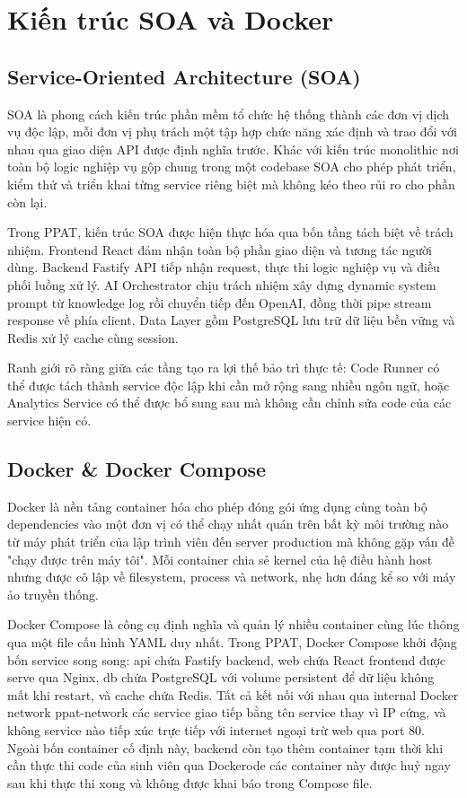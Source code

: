 \documentclass[../main.tex]{subfiles}
\begin{document}
\section{Kiến trúc SOA và Docker}

\subsection{Service-Oriented Architecture (SOA)}

SOA là phong cách kiến trúc phần mềm tổ chức hệ thống thành các đơn vị dịch vụ độc lập, mỗi đơn vị phụ trách một tập hợp chức năng xác định và trao đổi với nhau qua giao diện API được định nghĩa trước. Khác với kiến trúc monolithic nơi toàn bộ logic nghiệp vụ gộp chung trong một codebase SOA cho phép phát triển, kiểm thử và triển khai từng service riêng biệt mà không kéo theo rủi ro cho phần còn lại.

Trong PPAT, kiến trúc SOA được hiện thực hóa qua bốn tầng tách biệt về trách nhiệm. Frontend React đảm nhận toàn bộ phần giao diện và tương tác người dùng. Backend Fastify API tiếp nhận request, thực thi logic nghiệp vụ và điều phối luồng xử lý. AI Orchestrator chịu trách nhiệm xây dựng dynamic system prompt từ knowledge log rồi chuyển tiếp đến OpenAI, đồng thời pipe stream response về phía client. Data Layer gồm PostgreSQL lưu trữ dữ liệu bền vững và Redis xử lý cache cùng session.

Ranh giới rõ ràng giữa các tầng tạo ra lợi thế bảo trì thực tế: Code Runner có thể được tách thành service độc lập khi cần mở rộng sang nhiều ngôn ngữ, hoặc Analytics Service có thể được bổ sung sau mà không cần chỉnh sửa code của các service hiện có.

\subsection{Docker \& Docker Compose}

Docker là nền tảng container hóa cho phép đóng gói ứng dụng cùng toàn bộ dependencies vào một đơn vị có thể chạy nhất quán trên bất kỳ môi trường nào từ máy phát triển của lập trình viên đến server production mà không gặp vấn đề "chạy được trên máy tôi". Mỗi container chia sẻ kernel của hệ điều hành host nhưng được cô lập về filesystem, process và network, nhẹ hơn đáng kể so với máy ảo truyền thống.

Docker Compose là công cụ định nghĩa và quản lý nhiều container cùng lúc thông qua một file cấu hình YAML duy nhất. Trong PPAT, Docker Compose khởi động bốn service song song: api chứa Fastify backend, web chứa React frontend được serve qua Nginx, db chứa PostgreSQL với volume persistent để dữ liệu không mất khi restart, và cache chứa Redis. Tất cả kết nối với nhau qua internal Docker network ppat-network các service giao tiếp bằng tên service thay vì IP cứng, và không service nào tiếp xúc trực tiếp với internet ngoại trừ web qua port 80. Ngoài bốn container cố định này, backend còn tạo thêm container tạm thời khi cần thực thi code của sinh viên qua Dockerode các container này được huỷ ngay sau khi thực thi xong và không được khai báo trong Compose file.
\end{document}
